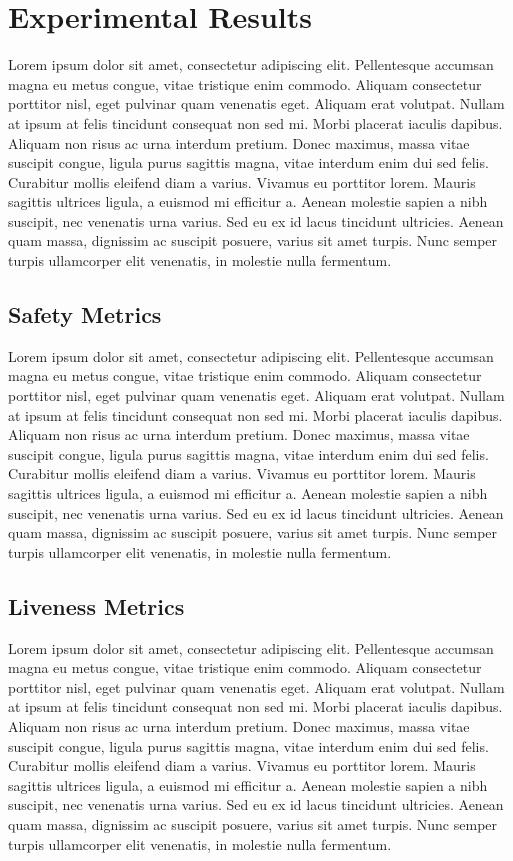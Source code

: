 \chapter{Experimental Results}

Lorem ipsum dolor sit amet, consectetur adipiscing elit. Pellentesque accumsan magna eu metus congue, vitae tristique enim commodo. Aliquam consectetur porttitor nisl, eget pulvinar quam venenatis eget. Aliquam erat volutpat. Nullam at ipsum at felis tincidunt consequat non sed mi. Morbi placerat iaculis dapibus. Aliquam non risus ac urna interdum pretium. Donec maximus, massa vitae suscipit congue, ligula purus sagittis magna, vitae interdum enim dui sed felis. Curabitur mollis eleifend diam a varius. Vivamus eu porttitor lorem. Mauris sagittis ultrices ligula, a euismod mi efficitur a. Aenean molestie sapien a nibh suscipit, nec venenatis urna varius. Sed eu ex id lacus tincidunt ultricies. Aenean quam massa, dignissim ac suscipit posuere, varius sit amet turpis. Nunc semper turpis ullamcorper elit venenatis, in molestie nulla fermentum.

\section{Safety Metrics}

Lorem ipsum dolor sit amet, consectetur adipiscing elit. Pellentesque accumsan magna eu metus congue, vitae tristique enim commodo. Aliquam consectetur porttitor nisl, eget pulvinar quam venenatis eget. Aliquam erat volutpat. Nullam at ipsum at felis tincidunt consequat non sed mi. Morbi placerat iaculis dapibus. Aliquam non risus ac urna interdum pretium. Donec maximus, massa vitae suscipit congue, ligula purus sagittis magna, vitae interdum enim dui sed felis. Curabitur mollis eleifend diam a varius. Vivamus eu porttitor lorem. Mauris sagittis ultrices ligula, a euismod mi efficitur a. Aenean molestie sapien a nibh suscipit, nec venenatis urna varius. Sed eu ex id lacus tincidunt ultricies. Aenean quam massa, dignissim ac suscipit posuere, varius sit amet turpis. Nunc semper turpis ullamcorper elit venenatis, in molestie nulla fermentum.

\section{Liveness Metrics}

Lorem ipsum dolor sit amet, consectetur adipiscing elit. Pellentesque accumsan magna eu metus congue, vitae tristique enim commodo. Aliquam consectetur porttitor nisl, eget pulvinar quam venenatis eget. Aliquam erat volutpat. Nullam at ipsum at felis tincidunt consequat non sed mi. Morbi placerat iaculis dapibus. Aliquam non risus ac urna interdum pretium. Donec maximus, massa vitae suscipit congue, ligula purus sagittis magna, vitae interdum enim dui sed felis. Curabitur mollis eleifend diam a varius. Vivamus eu porttitor lorem. Mauris sagittis ultrices ligula, a euismod mi efficitur a. Aenean molestie sapien a nibh suscipit, nec venenatis urna varius. Sed eu ex id lacus tincidunt ultricies. Aenean quam massa, dignissim ac suscipit posuere, varius sit amet turpis. Nunc semper turpis ullamcorper elit venenatis, in molestie nulla fermentum.

